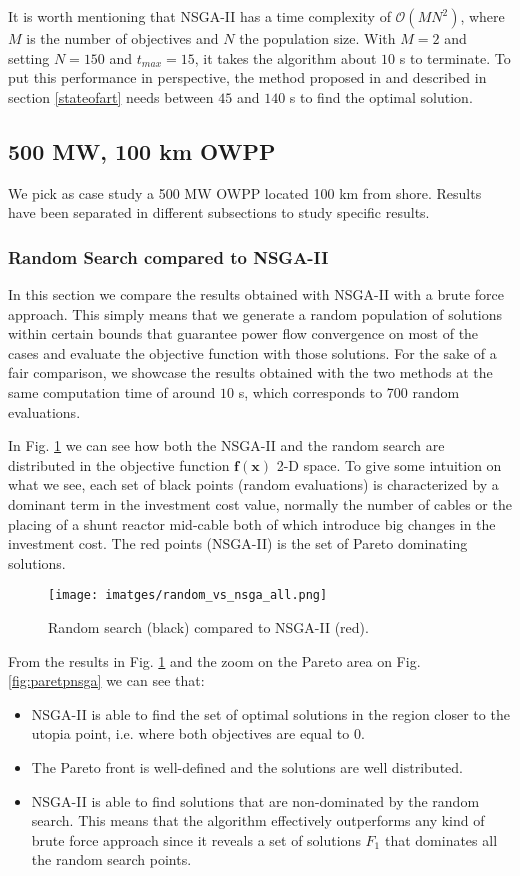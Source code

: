 \documentclass[a4paper,11pt, titlepage, twoside]{article}
\begin{document}
It is worth mentioning that NSGA-II has a time complexity of $\mathcal{O}(MN^2)$, where $M$ is the number of objectives and $N$ the population size. With $M=2$ and setting $N=150$ and $t_{max}=15$,
it takes the algorithm about $10$ s to terminate. To put this performance in perspective, the method proposed in \cite{paperbase} and described in section \ref{stateofart} needs between $45$ and $140$ s to find the optimal solution.


\subsection{500 MW, 100 km OWPP}

We pick as case study a 500 MW OWPP located 100 km from shore. Results have been separated in different subsections to study specific results.

\subsubsection{Random Search compared to NSGA-II}

In this section we compare the results obtained with NSGA-II with a brute force approach. This simply means that we generate a random population of solutions within certain bounds that guarantee power flow convergence on most of the cases and evaluate the objective function with those solutions.
For the sake of a fair comparison, we showcase the results obtained with the two methods at the same computation time of around $10$ s, which corresponds to 700 random evaluations.

In Fig. \ref{fig:searchall} we can see how both the NSGA-II and the random search are distributed in the objective function $\mathbf{f(x)}$ 2-D space. To give some intuition on what we see, each set of black points (random evaluations) is characterized by a dominant term in the investment cost value, normally the number of cables or the placing 
of a shunt reactor mid-cable both of which introduce big changes in the investment cost. The red points (NSGA-II) is the set of Pareto dominating solutions.
\begin{figure}[H]
    \centering
    \texttt{[image: imatges/random\_vs\_nsga\_all.png]}
    \caption{Random search (black) compared to NSGA-II (red).}
    \label{fig:searchall}
\end{figure}

From the results in Fig. \ref{fig:searchall} and the zoom on the Pareto area on Fig. \ref{fig:paretpnsga} we can see that:
\begin{itemize}
    \item NSGA-II is able to find the set of optimal solutions in the region closer to the utopia point, i.e. where both objectives are equal to 0.
    \item The Pareto front is well-defined and the solutions are well distributed.
    \item NSGA-II is able to find solutions that are non-dominated by the random search. This means that the algorithm effectively outperforms any kind of brute force approach
    since it reveals a  set of solutions $F_1$ that dominates all the random search points.
\end{itemize}
\end{document}
